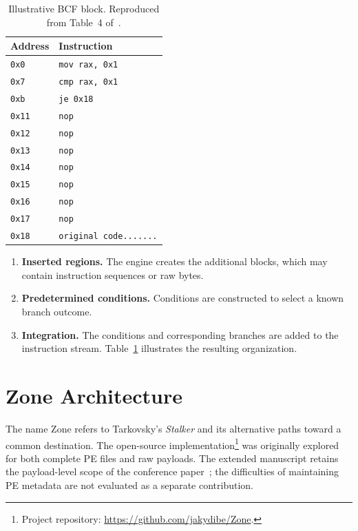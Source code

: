 \documentclass[runningheads]{llncs}
\begin{document}
\begin{table}[t]
\caption{Illustrative BCF block. Reproduced from Table~4 of~\cite{zone_secrypt_2026}.}
\small
\centering
\setlength{\tabcolsep}{3pt}
\label{table:bcf_code}
\begin{tabular}{ll}
    \hline
    \textbf{Address}    & \textbf{Instruction} \\ \hline

    \verb|0x0|  & 	\verb|mov rax, 0x1|  \\ \hline
    \verb|0x7|	&   \verb|cmp rax, 0x1|  \\ \hline
    \verb|0xb| 	&   \verb|je 0x18|  \\ \hline
    \verb|0x11|	&   \verb|nop|  \\ \hline
    \verb|0x12|	&   \verb|nop|  \\ \hline
    \verb|0x13|	&   \verb|nop|  \\ \hline
    \verb|0x14|	&   \verb|nop|  \\ \hline
    \verb|0x15|	&   \verb|nop|  \\ \hline
    \verb|0x16|	&   \verb|nop|  \\ \hline
    \verb|0x17|	&   \verb|nop|  \\ \hline
    \verb|0x18|	&\verb|original code.......|    \\ \hline
\end{tabular}
\end{table}

\begin{enumerate}
\item \textbf{Inserted regions.} The engine creates the additional blocks, which may contain instruction sequences or raw bytes.
    \item \textbf{Predetermined conditions.} Conditions are constructed to select a known branch outcome.
    \item \textbf{Integration.} The conditions and corresponding branches are added to the instruction stream. Table~\ref{table:bcf_code} illustrates the resulting organization.

\end{enumerate}

\section{Zone Architecture}\label{sec:developing_meth}
The name Zone refers to Tarkovsky's \emph{Stalker} and its alternative paths toward a common destination. The open-source implementation\footnote{Project repository: \url{https://github.com/jakydibe/Zone}.} was originally explored for both complete PE files and raw payloads. The extended manuscript retains the payload-level scope of the conference paper~\cite{zone_secrypt_2026}; the difficulties of maintaining PE metadata are not evaluated as a separate contribution.
\end{document}
